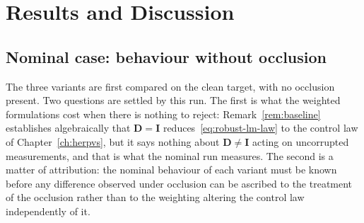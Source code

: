 %
%
%

\section{Results and Discussion}
\label{sec:ablation-results}

\subsection{Nominal case: behaviour without occlusion}
\label{sec:nominal}

The three variants are first compared on the clean target, with no occlusion
present. Two questions are settled by this run. The first is what the weighted
formulations cost when there is nothing to reject:
Remark~\ref{rem:baseline} establishes algebraically that $\mathbf{D}=\mathbf{I}$
reduces~\eqref{eq:robust-lm-law} to the control law of
Chapter~\ref{ch:herpvs}, but it says nothing about $\mathbf{D}\neq\mathbf{I}$
acting on uncorrupted measurements, and that is what the nominal run measures.
The second is a matter of attribution: the nominal behaviour of each variant
must be known before any difference observed under occlusion can be ascribed to
the treatment of the occlusion rather than to the weighting altering the
control law independently of it.

